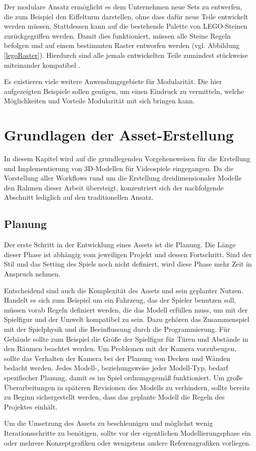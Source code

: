 \vspace{-10.5pt}
Der modulare Ansatz ermöglicht es dem Unternehmen neue Sets zu entwerfen, die zum Beispiel den Eiffelturm darstellen, ohne dass dafür neue Teile entwickelt werden müssen. Stattdessen kann auf die bestehende Palette von LEGO-Steinen zurückgegriffen werden. Damit dies funktioniert, müssen alle Steine Regeln befolgen und auf einem bestimmten Raster entworfen werden (vgl. Abbildung \ref{legoRaster}). Hierdurch sind alle jemals entwickelten Teile zumindest stückweise miteinander kompatibel \parencite[S.\,11]{LegoBuch}.
\par
Es existieren viele weitere Anwendungsgebiete für Modularität. Die hier aufgezeigten Beispiele sollen genügen, um einen Eindruck zu vermitteln, welche Möglichkeiten und Vorteile Modularität mit sich bringen kann.
\chapter{Grundlagen der Asset-Erstellung}
In diesem Kapitel wird auf die grundlegenden Vorgehensweisen für die Erstellung und Implementierung von 3D-Modellen für Videospiele eingegangen. Da die Vorstellung aller Workflows rund um die Erstellung dreidimensionaler Modelle den Rahmen dieser Arbeit übersteigt, konzentriert sich der nachfolgende Abschnitt lediglich auf den traditionellen Ansatz.
\section{Planung}
Der erste Schritt in der Entwicklung eines Assets ist die Planung. Die Länge dieser Phase ist abhängig vom jeweiligen Projekt und dessen Fortschritt. Sind der Stil und das Setting des Spiels noch nicht definiert, wird diese Phase mehr Zeit in Anspruch nehmen.
\par
Entscheidend sind auch die Komplexität des Assets und sein geplanter Nutzen. Handelt es sich zum Beispiel um ein Fahrzeug, das der Spieler benutzen soll, müssen vorab Regeln definiert werden, die das Modell erfüllen muss, um mit der Spielfigur und der Umwelt kompatibel zu sein. Dazu gehören das Zusammenspiel mit der Spielphysik und die Beeinflussung durch die Programmierung. Für Gebäude sollte zum Beispiel die Größe der Spielfigur für Türen und Abstände in den Räumen beachtet werden. Um Problemen mit der Kamera vorzubeugen, sollte das Verhalten der Kamera bei der Planung von Decken und Wänden bedacht werden. Jedes Modell-, beziehungsweise jeder Modell-Typ, bedarf spezifischer Planung, damit es im Spiel ordnungsgemäß funktioniert. Um große Überarbeitungen in späteren Revisionen des Modells zu verhindern, sollte bereits zu Beginn sichergestellt werden, dass das geplante Modell die Regeln des Projektes einhält.
\par
Um die Umsetzung des Assets zu beschleunigen und möglichst wenig Iterationsschritte zu benötigen, sollte vor der eigentlichen Modellierungsphase ein oder mehrere Konzeptgrafiken oder wenigstens andere Referenzgrafiken vorliegen.
\newpage
